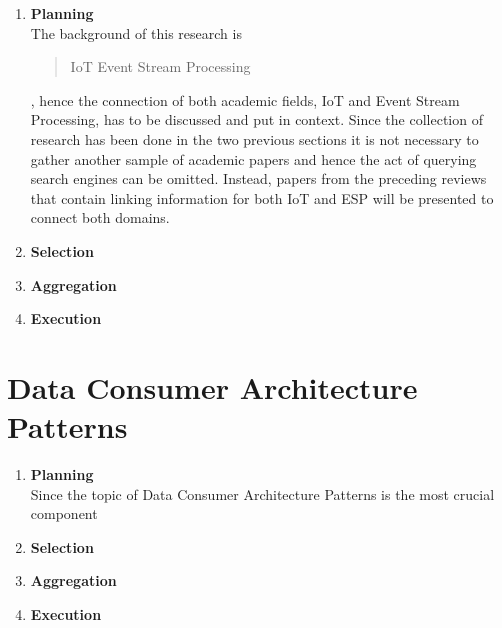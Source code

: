 \begin{enumerate}
    \item
    \textbf{Planning}\\
    The background of this research is \blockquote{IoT Event Stream Processing}, hence the connection of both academic fields, IoT and Event Stream Processing, has to be discussed and put in context. Since the collection of research has been done in the two previous sections it is not necessary to gather another sample of academic papers and hence the act of querying search engines can be omitted. Instead, papers from the preceding reviews that contain linking information for both IoT and ESP will be presented to connect both domains.
    
    \item
    \textbf{Selection}\\
    
    \item
    \textbf{Aggregation}\\
    
    \item
    \textbf{Execution}\\
    
\end{enumerate}


\section{Data Consumer Architecture Patterns}

\begin{enumerate}
    \item
    \textbf{Planning}\\
    Since the topic of Data Consumer Architecture Patterns is the most crucial component 
    
    \item
    \textbf{Selection}\\
    
    \item
    \textbf{Aggregation}\\
    
    \item
    \textbf{Execution}\\
    
\end{enumerate}

